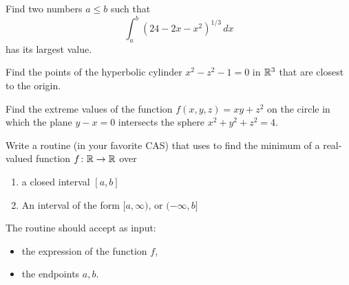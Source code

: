 \begin{problem}[Basic]
Find two numbers $a \leq b$ such that 
\begin{equation*}
\int_a^b (24-2x-x^2)^{1/3}\, dx
\end{equation*}
has its largest value.
\end{problem}

\begin{problem}[Intermediate] %
Find the points of the hyperbolic cylinder $x^2-z^2-1=0$ in $\mathbb{R}^3$ that are closest to the origin.
\end{problem}

\begin{problem}[Intermediate]
Find the extreme values of the function $f(x,y,z)=xy+z^2$ on the circle in which the plane $y-x=0$ intersects the sphere $x^2+y^2+z^2=4$.
\end{problem}

\begin{problem}[CAS]
Write a routine (in your favorite CAS) that uses  to find the minimum of a real-valued function $f \colon \mathbb{R} \to \mathbb{R}$ over 
\begin{enumerate}
	\item a closed interval $[a,b]$
	\item An interval of the form $[a,\infty)$, or $(-\infty, b]$
\end{enumerate}
The routine should accept as input:
\begin{itemize}
	\item the expression of the function $f$,
	\item the endpoints $a,b$.
\end{itemize}
\end{problem}